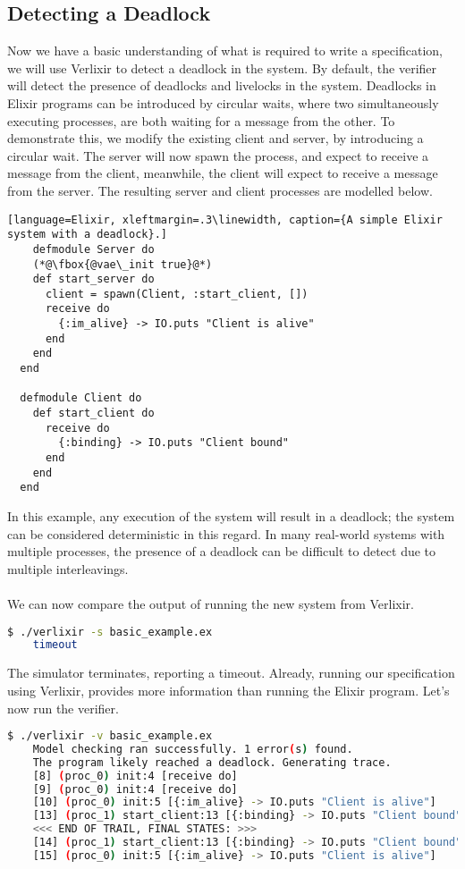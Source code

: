\subsection{Detecting a Deadlock} \label{sec:deadlock}
Now we have a basic understanding of what is required to write a specification, we will use Verlixir to detect a deadlock in the system. By default, the verifier will detect the presence of deadlocks and livelocks in the system. Deadlocks in Elixir programs can be introduced by circular waits, where two simultaneously executing processes, are both waiting for a message from the other. To demonstrate this, we modify the existing client and server, by introducing a circular wait. The server will now spawn the process, and expect to receive a message from the client, meanwhile, the client will expect to receive a message from the server. The resulting server and client processes are modelled below.
\begin{lstlisting}[language=Elixir, xleftmargin=.3\linewidth, caption={A simple Elixir system with a deadlock}.]
    defmodule Server do
    (*@\fbox{@vae\_init true}@*)
    def start_server do
      client = spawn(Client, :start_client, [])
      receive do
        {:im_alive} -> IO.puts "Client is alive"
      end
    end
  end
  
  defmodule Client do
    def start_client do
      receive do
        {:binding} -> IO.puts "Client bound"
      end
    end
  end  
\end{lstlisting}
In this example, any execution of the system will result in a deadlock; the system can be considered deterministic in this regard. In many real-world systems with multiple processes, the presence of a deadlock can be difficult to detect due to multiple interleavings.
\\ \\
We can now compare the output of running the new system from Verlixir.
\begin{lstlisting}[language=bash, xleftmargin=.3\linewidth]
    $ ./verlixir -s basic_example.ex
    timeout
\end{lstlisting}
The simulator terminates, reporting a timeout. Already, running our specification using Verlixir, provides more information than running the Elixir program. Let's now run the verifier.
\begin{lstlisting}[language=bash, xleftmargin=.2\linewidth]
    $ ./verlixir -v basic_example.ex
    Model checking ran successfully. 1 error(s) found.
    The program likely reached a deadlock. Generating trace.
    [8] (proc_0) init:4 [receive do]
    [9] (proc_0) init:4 [receive do]
    [10] (proc_0) init:5 [{:im_alive} -> IO.puts "Client is alive"]
    [13] (proc_1) start_client:13 [{:binding} -> IO.puts "Client bound"]
    <<< END OF TRAIL, FINAL STATES: >>>
    [14] (proc_1) start_client:13 [{:binding} -> IO.puts "Client bound"]
    [15] (proc_0) init:5 [{:im_alive} -> IO.puts "Client is alive"]
\end{lstlisting}
